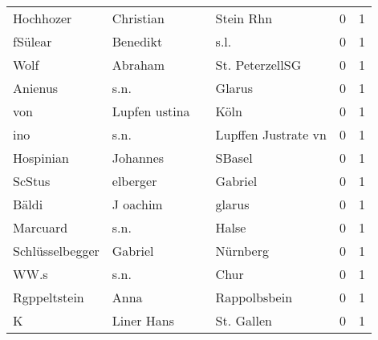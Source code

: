 \begin{center}
\begin{tiny}
\begin{longtabu}{llllrr}
                Hochhozer &                          Christian &             &                                   Stein Rhn &          0 &         1 \\
                  fSülear &                           Benedikt &             &                                        s.l. &          0 &         1 \\
                     Wolf &                            Abraham &             &                             St. PeterzellSG &          0 &         1 \\
                  Anienus &                               s.n. &             &                                      Glarus &          0 &         1 \\
                      von &                      Lupfen ustina &             &                                        Köln &          0 &         1 \\
                      ino &                               s.n. &             &                         Lupffen Justrate vn &          0 &         1 \\
                Hospinian &                           Johannes &             &                                      SBasel &          0 &         1 \\
                   ScStus &                           elberger &             &                                     Gabriel &          0 &         1 \\
                    Bäldi &                           J oachim &             &                                      glarus &          0 &         1 \\
                 Marcuard &                               s.n. &             &                                       Halse &          0 &         1 \\
          Schlüsselbegger &                            Gabriel &             &                                    Nürnberg &          0 &         1 \\
                     WW.s &                               s.n. &             &                                        Chur &          0 &         1 \\
             Rgppeltstein &                               Anna &             &                                Rappolbsbein &          0 &         1 \\
                        K &                         Liner Hans &             &                                  St. Gallen &          0 &         1 \\

\end{longtabu}
\end{tiny}
\end{center}
